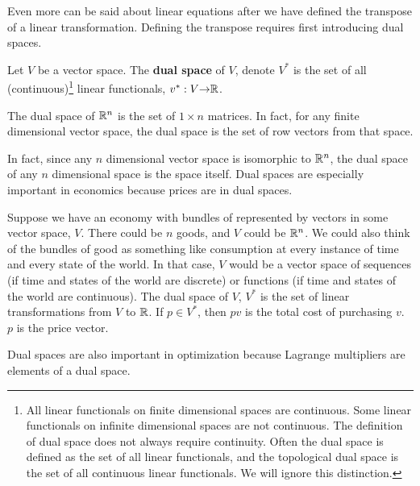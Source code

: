 Even more can be said about linear equations after we have defined the
transpose of a linear transformation.  Defining the transpose requires
first introducing dual spaces. 
\begin{definition}
  Let $V$ be a vector space. The \textbf{dual space} of $V$, denote
  $V^\ast$ is the set of all (continuous)\footnote{All linear
    functionals on finite dimensional spaces are continuous. Some
    linear functionals on infinite dimensional spaces are not
    continuous. The definition of dual space does not always require
    continuity. Often the dual space is defined as the set of all
    linear functionals, and the topological dual space is the set of
    all continuous linear functionals. We will ignore this
    distinction.}  linear functionals, $v^\ast: V {\rightarrow} \mathbb{R}$.
\end{definition}
\begin{example}\label{ex:rdual}
  The dual space of $\mathbb{R}^n$ is the set of $1 \times n$ matrices. In
  fact, for any finite dimensional vector space, the dual space is the
  set of row vectors from that space. 
\end{example}
In fact, since any $n$ dimensional vector space is isomorphic to
$\mathbb{R}^n$, the dual space of any $n$ dimensional space is the space
itself. Dual spaces are especially important in economics because
prices are in dual spaces.
\begin{example}
  Suppose we have an economy with bundles of represented by vectors in
  some vector space, $V$. There could be $n$ goods, and $V$ could be
  $\mathbb{R}^n$. We could also think of the bundles of good as something like
  consumption at every instance of time and every state of the
  world. In that case, $V$ would be a vector space of sequences (if
  time and states of the world are discrete) or functions (if time and
  states of the world are continuous). The dual space of $V$, $V^\ast$
  is the set of linear transformations from $V$ to $\mathbb{R}$. If $p \in
  V^\ast$, then $pv$ is the total cost of purchasing $v$. $p$ is the
  price vector.
\end{example}
Dual spaces are also important in optimization because Lagrange
multipliers are elements of a dual space.

